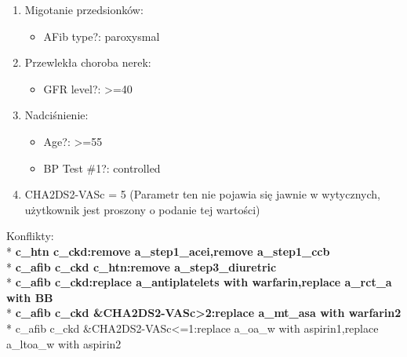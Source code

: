 \begin{enumerate}
\item{Migotanie przedsionków:
	\begin{itemize}
	\item{AFib type?: paroxysmal}
	\end{itemize}
}
\item{Przewlekła choroba nerek:
	\begin{itemize}
	\item{GFR level?: >=40}
	\end{itemize}
}
\item{Nadciśnienie:
	\begin{itemize}
	\item{Age?: >=55}
	\item{BP Test \#1?: controlled}
	\end{itemize}
}
\item{CHA2DS2-VASc = 5 (Parametr ten nie pojawia się jawnie w wytycznych, użytkownik jest proszony o podanie tej wartości)}
\end{enumerate}
Konflikty:\\*
\textbf{c\_htn c\_ckd:remove a\_step1\_acei,remove a\_step1\_ccb}\\*
\textbf{c\_afib c\_ckd c\_htn:remove a\_step3\_diuretric}\\*
\textbf{c\_afib c\_ckd:replace a\_antiplatelets with warfarin,replace a\_rct\_a with BB}\\*
\textbf{c\_afib c\_ckd \&CHA2DS2-VASc>2:replace a\_mt\_asa with warfarin2}\\*
c\_afib c\_ckd \&CHA2DS2-VASc<=1:replace a\_oa\_w with aspirin1,replace a\_ltoa\_w with aspirin2
\newpage
